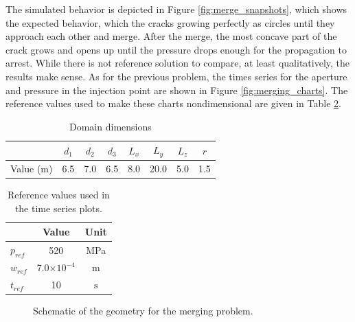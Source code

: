The simulated behavior is depicted in Figure \ref{fig:merge_snapshots}, which shows the expected behavior, which the cracks growing perfectly as circles until they approach each other and merge. After the merge, the most concave part of the crack grows and opens up until the pressure drops enough for the propagation to arrest. While there is not reference solution to compare, at least qualitatively, the results make sense. As for the previous problem, the times series for the aperture and pressure in the injection point are shown in Figure \ref{fig:merging_charts}. The reference values used to make these charts nondimensional are given in Table \ref{merging_refs}.

\begin{table}[ht]
  \centering
  \caption{Domain dimensions}
  \begin{tabular}[t]{lccccccc}
  \hline
  &$d_1$&$d_2$&$d_3$&$L_x$&$L_y$&$L_z$&$r$\\  
  \hline
  Value (m) & 6.5 & 7.0 & 6.5 & 8.0 & 20.0 & 5.0 & 1.5\\
  \hline
  \end{tabular}
  \label{merging_measures}
\end{table}%

\begin{table}[ht]
  \centering
  \caption{Reference values used in the time series plots.}
  \begin{tabular}[t]{lcc}
  \hline
  &Value &Unit \\
  \hline
  $p_{ref}$&520&MPa\\
  $w_{ref}$&7.0$\times 10^{-4}$&m\\
  $t_{ref}$&10&$\text{s}$\\
  \hline
  \end{tabular}
  \label{merging_refs}
\end{table}%

\begin{figure}[ht]
  \centering
  \caption{Schematic of the geometry for the merging problem.}
  \label{fig:merging_schematic}
\end{figure}


